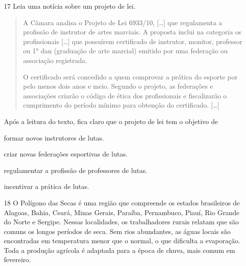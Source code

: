 \num{17} Leia uma notícia sobre um projeto de lei.
\begin{quote}
  A Câmara analisa o Projeto de Lei 6933/10, {[}\ldots{}{]} que regulamenta a
  profissão de instrutor de artes marciais. A proposta inclui na
  categoria os profissionais {[}\ldots{}{]} que possuírem certificado de
  instrutor, monitor, professor ou 1° dan (graduação de arte marcial)
  emitido por uma federação ou associação registrada.

O certificado será concedido a quem comprovar a prática do esporte por
pelo menos dois anos e meio. Segundo o projeto, as federações e
associações criarão o código de ética dos profissionais e fiscalizarão o
cumprimento do período mínimo para obtenção do certificado. {[}\ldots{}{]}
\end{quote}


\noindent{}Após a leitura do texto, fica claro que o projeto de lei tem o objetivo de

\begin{escolha}
\item formar novos instrutores de lutas.

\item criar novas federações esportivas de lutas.

\item regulamentar a profissão de professores de lutas.

\item incentivar a prática de lutas.
\end{escolha}


\num{18} O Polígono das Secas é uma região que compreende os estados
brasileiros de Alagoas, Bahia, Ceará, Minas Gerais, Paraíba, Pernambuco,
Piauí, Rio Grande do Norte e Sergipe. Nessas localidades, os
trabalhadores rurais relatam que são comuns os longos períodos de seca.
Sem rios abundantes, as águas locais são encontradas em temperatura
menor que o normal, o que dificulta a evaporação. Toda a produção
agrícola é adaptada para a época de chuva, mais comum em fevereiro.

